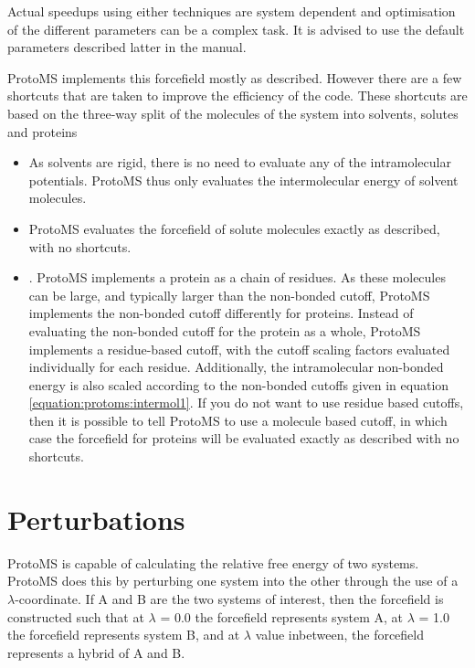 \documentclass[letterpaper,10pt,english]{sphinxmanual}
\begin{document}
Actual speedups using either techniques are system dependent and optimisation of the different parameters can be a complex task. It is advised to use the default parameters described latter in the manual.


ProtoMS implements this forcefield mostly as described. However there are a few shortcuts that are taken to improve the efficiency of the code. These shortcuts are based on the three-way split of the molecules of the system into solvents, solutes and proteins
\begin{itemize}
\item {} 
 As solvents are rigid, there is no need to evaluate any of the intramolecular potentials. ProtoMS thus only evaluates the intermolecular energy of solvent molecules.

\item {} 
 ProtoMS evaluates the forcefield of solute molecules exactly as described, with no shortcuts.

\item {} 
. ProtoMS implements a protein as a chain of residues. As these molecules can be large, and typically larger than the non-bonded cutoff, ProtoMS implements the non-bonded cutoff differently for proteins. Instead of evaluating the non-bonded cutoff for the protein as a whole, ProtoMS implements a residue-based cutoff, with the cutoff scaling factors evaluated individually for each residue. Additionally, the intramolecular non-bonded energy is also scaled according to the non-bonded cutoffs given in equation \eqref{equation:protoms:intermol1}. If you do not want to use residue based cutoffs, then it is possible to tell ProtoMS to use a molecule based cutoff, in which case the forcefield for proteins will be evaluated exactly as described with no shortcuts.

\end{itemize}

\ignorespaces 

\section{Perturbations}
\label{\detokenize{protoms:index-14}}\label{\detokenize{protoms:perturbations}}
ProtoMS is capable of calculating the relative free energy of two systems. ProtoMS does this by perturbing one system into the other through the use of a \(\lambda\)-coordinate. If A and B are the two systems of interest, then the forcefield is constructed such that at \(\lambda\) = 0.0 the forcefield represents system A, at \(\lambda\) = 1.0 the forcefield represents system B, and at \(\lambda\) value inbetween, the forcefield represents a hybrid of A and B.
\end{document}
